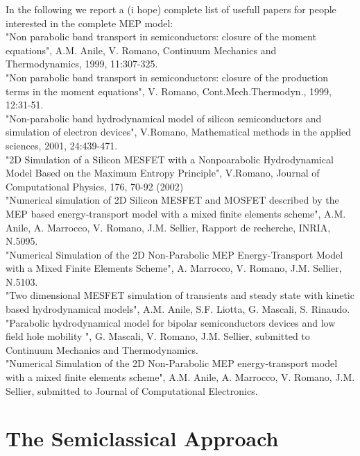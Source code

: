 \documentclass[12pt]{book}
\begin{document}
In the following we report a (i hope) complete list of usefull papers for people interested in the complete MEP model:
\\
"Non parabolic band transport in semiconductors: closure of the moment equations", A.M. Anile, V. Romano, Continuum Mechanics and Thermodynamics, 1999, 11:307-325.
\\
"Non parabolic band transport in semiconductors: closure of the production terms in the moment equations", V. Romano, Cont.Mech.Thermodyn., 1999, 12:31-51.
\\
"Non-parabolic band hydrodynamical model of silicon semiconductors and simulation of electron devices", V.Romano, Mathematical methods in the applied sciences, 2001, 24:439-471.
\\
"2D Simulation of a Silicon MESFET with a Nonpoarabolic Hydrodynamical Model Based on the Maximum Entropy Principle", V.Romano, Journal of Computational Physics, 176, 70-92 (2002)
\\
"Numerical simulation of 2D Silicon MESFET and MOSFET described by the MEP based energy-transport model with a mixed finite elements scheme", A.M. Anile, A. Marrocco, V. Romano, J.M. Sellier, Rapport de recherche, INRIA, N.5095.
\\
"Numerical Simulation of the 2D Non-Parabolic MEP Energy-Transport Model with a Mixed Finite Elements Scheme", A. Marrocco, V. Romano, J.M. Sellier, N.5103.
\\
"Two dimensional MESFET simulation of transients and steady state with kinetic based hydrodynamical models", A.M. Anile, S.F. Liotta, G. Mascali, S. Rinaudo.
\\
"Parabolic hydrodynamical model for bipolar semiconductors devices and low field hole mobility ", G. Mascali, V. Romano, J.M. Sellier, submitted to Continuum Mechanics and Thermodynamics.
\\
"Numerical Simulation of the 2D Non-Parabolic MEP energy-transport model with a mixed finite elements scheme", A.M. Anile, A. Marrocco, V. Romano, J.M. Sellier, submitted to Journal of Computational Electronics.
\\

\section{The Semiclassical Approach}
\end{document}
